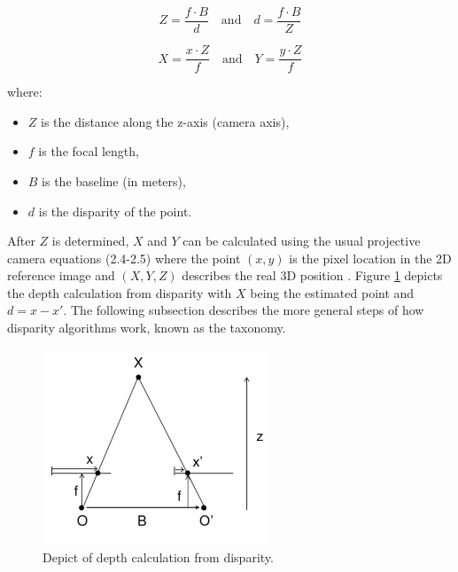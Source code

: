\begin{equation}
  Z = \frac{f \cdot B}{d}\quad \textrm{and}\quad d = \frac{f \cdot B}{Z}
\end{equation}

\begin{equation}
  X = \frac{x \cdot Z}{f}\quad \textrm{and}\quad Y = \frac{y \cdot Z}{f}
\end{equation}

where:

\begin{itemize}
  \item $Z$ is the distance along the z-axis (camera axis),
  \item $f$ is the focal length,
  \item $B$ is the baseline (in meters),
  \item $d$ is the disparity of the point.
\end{itemize}

\noindent After $Z$ is determined, $X$ and $Y$ can be calculated using the usual projective camera equations (2.4-2.5) where the point $(x,y)$ is the pixel location in the 2D reference image and $(X,Y,Z)$ describes the real 3D position \citep{scharstein2002taxonomy, cyganek2011introduction, block20133d, martull2012realistic}.
Figure \ref{fig:depth-estimation} depicts the depth calculation from disparity with $X$ being the estimated point and $d = x - x'$.
\newline\newline\noindent The following subsection describes the more general steps of how disparity algorithms work, known as the taxonomy.

\begin{figure}[h!]
  \centering
  \includegraphics[width=0.6\textwidth]{src/images/depth-calculation.png}
  \caption[Depict of depth calculation from disparity.]{Depict of depth calculation from disparity.\protect\footnotemark}
  \label{fig:depth-estimation}
\end{figure}


